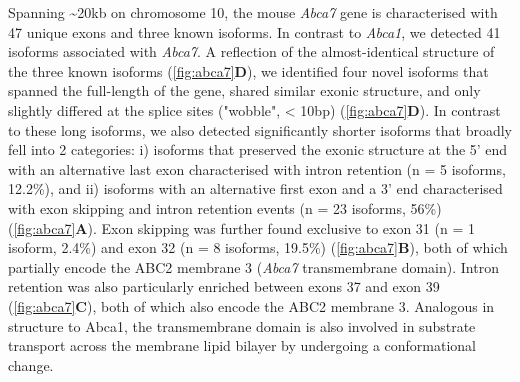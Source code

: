 Spanning \textasciitilde20kb on chromosome 10, the mouse \textit{Abca7} gene is characterised with 47 unique exons and three known isoforms. In contrast to \textit{Abca1}, we detected 41 isoforms associated with \textit{Abca7}. A reflection of the almost-identical structure of the three known isoforms (\cref{fig:abca7}\textbf{D}), we identified four novel isoforms that spanned the full-length of the gene, shared similar exonic structure, and only slightly differed  at the splice sites ("wobble", < 10bp) (\cref{fig:abca7}\textbf{D}). In contrast to these long isoforms, we also detected significantly shorter isoforms that broadly fell into 2 categories: i) isoforms that preserved the exonic structure at the 5' end with an alternative last exon characterised with intron retention (n = 5 isoforms, 12.2\%), and ii) isoforms with an alternative first exon and a 3' end characterised with exon skipping and intron retention events (n = 23 isoforms, 56\%) (\cref{fig:abca7}\textbf{A}). Exon skipping was further found exclusive to exon 31 (n = 1 isoform, 2.4\%) and exon 32 (n = 8 isoforms, 19.5\%) (\cref{fig:abca7}\textbf{B}), both of which partially encode the ABC2 membrane 3 (\textit{Abca7} transmembrane domain)\cite{DeRoeck2019a}. Intron retention was also particularly enriched between exons 37 and exon 39 (\cref{fig:abca7}\textbf{C}), both of which also encode the ABC2 membrane 3. Analogous in structure to Abca1, the transmembrane domain is also involved in substrate transport across the membrane lipid bilayer by undergoing a conformational change. 

